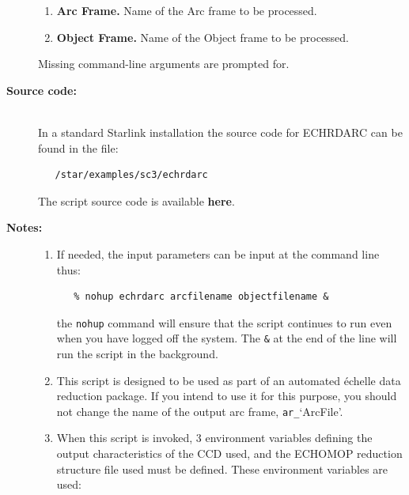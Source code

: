 \documentclass[twoside,11pt]{article}
\newenvironment{latexonly}{}{}
\newcommand{\htmlref}[2]{#1}
\begin{document}
\begin{description}
\begin{enumerate}

\item {\bf Arc Frame.}
      Name of the Arc frame to be processed.

\item {\bf Object Frame.}
      Name of the Object frame to be processed.

\end{enumerate}

     Missing command-line arguments are prompted for.

\item [{\bf Source code:}] \mbox{} \\
\begin{latexonly}
In a standard Starlink installation the source code for ECHRDARC can be found
in the file:
\begin{verbatim}
   /star/examples/sc3/echrdarc
\end{verbatim}
\end{latexonly}
\begin{htmlonly}
      The script source code is available
      \htmlref{{\bf here}}{se_echrdarc_source}.
\end{htmlonly}

\item [{\bf Notes:}] \mbox{}
\begin{enumerate}

\item If needed, the input parameters can be input at the command
      line thus:

\begin{verbatim}
   % nohup echrdarc arcfilename objectfilename &
\end{verbatim}

      the \verb+nohup+ command will ensure that the script continues
      to run even when you have logged off the system.  The \verb+&+ at
      the end of the line will run the script in the background.

\item This script is designed to be used as part of an automated
      \'{e}chelle data reduction package.  If you intend to use it
      for this purpose, you should not change the name of the output
      arc frame, \verb+ar_+`ArcFile'.

\item When this script is invoked, 3 environment variables defining
      the output characteristics of the CCD used, and the ECHOMOP
      reduction structure file used must be defined.
      These environment variables are used:


\end{enumerate}
\end{description}
\end{document}
